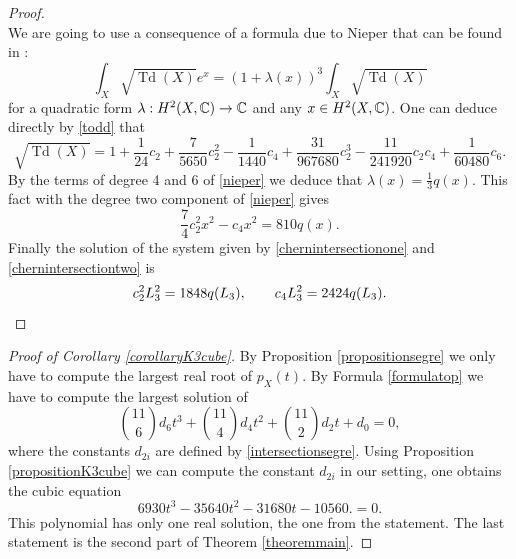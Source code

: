 \documentclass[11pt]{article}
\theoremstyle{plain}
\theoremstyle{definition}
\DeclareMathOperator{\Td}{Td}
\begin{document}
\begin{proof}
\begin{equation}
\end{equation}
We are going to use a consequence of a formula due to Nieper that can be found in \cite[Th.\,4.2]{Huy03b}:\vspace*{-3pt}
\begin{equation}\label{nieper}
\int_X\sqrt{\Td(X)}e^x=(1+\lambda(x))^3\int_X\sqrt{\Td(X)}
\end{equation}
for a quadratic form $\lambda:H^2(X,\mathbb{C})\to\mathbb{C}$ and any $x\in H^2(X,\mathbb{C})$.
One can deduce directly by \eqref{todd} that\vspace*{-3pt}
\[\sqrt{\Td(X)}=1+\frac{1}{24}c_2+\frac{7}{5650}c_2^2-\frac{1}{1440}c_4+\frac{31}{967680}c_2^3-\frac{11}{241920}c_2c_4+\frac{1}{60480}c_6.\]
By the terms of degree 4 and 6 of \eqref{nieper} we deduce that $\lambda(x)=\frac{1}{3}q(x)$. This fact with the degree two component of \eqref{nieper} gives
\begin{equation}\label{chernintersectiontwo}
\frac{7}{4}c_2^2x^2-c_4x^2=810 q(x).
\end{equation}
Finally the solution of the system given by \eqref{chernintersectionone} and \eqref{chernintersectiontwo} is
\[
c_2^2 L_3^2=1848 q(L_3), \qquad
c_4 L_3^2=2424 q(L_3).\qedhere
\]
\end{proof}

\begin{proof}[Proof of Corollary \ref{corollaryK3cube}]
By Proposition \ref{propositionsegre} we only have to compute the
largest real root of $p_X(t)$.
By Formula \eqref{formulatop}
we have to compute the largest solution of
\[
\binom{11}{6} d_6 t^3 + \binom{11}{4} d_4 t^2 + \binom{11}{2} d_2 t + d_0 = 0,
\]
where the constants $d_{2i}$ are defined by \eqref{intersectionsegre}.
Using Proposition \ref{propositionK3cube} we can compute the constant $d_{2i}$ in our setting,
one obtains the cubic equation
\[
6930 t^3-35640 t^2-31680 t-10560. = 0.
\]
This polynomial has only one real solution, the one from the statement.
The last statement is the second part of Theorem \ref{theoremmain}.
\end{proof}
\end{document}
